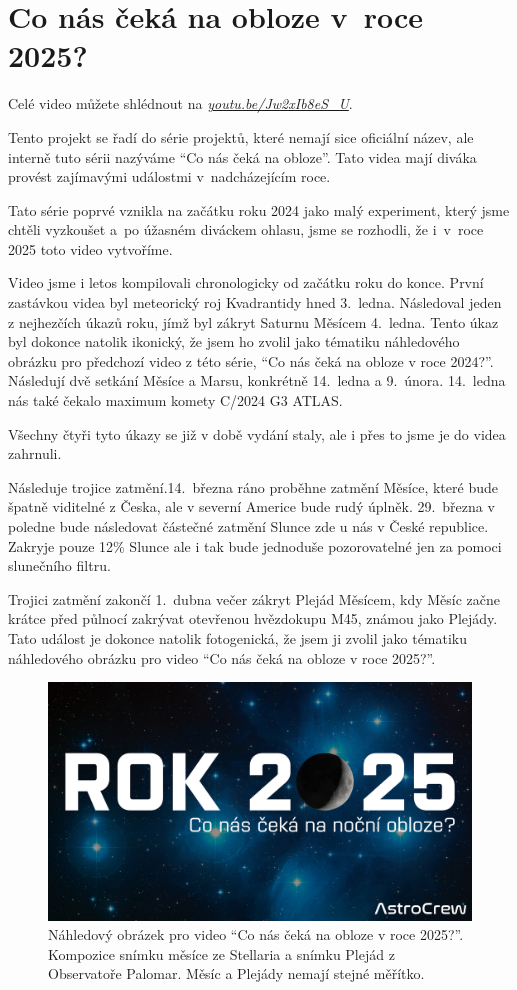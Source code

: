 \documentclass[12pt,a4paper,titlepage]{article}
\newcommand{\link}[2]{\href{#1}{\textcolor{link-color}{\textit{#2}}}}%
\begin{document}
\section{Co nás čeká na obloze v~roce 2025?}
Celé video můžete shlédnout na \link{https://youtu.be/Jw2xIb8eS\_U}{youtu.be/Jw2xIb8eS\_U}.

Tento projekt se řadí do série projektů, které nemají sice oficiální název, ale interně tuto sérii nazýváme \enquote{Co nás čeká na obloze}. Tato videa mají diváka provést zajímavými událostmi v~nadcházejícím roce.

Tato série poprvé vznikla na začátku roku 2024 jako malý experiment, který jsme chtěli vyzkoušet a~po úžasném diváckem ohlasu, jsme se rozhodli, že i~v~roce 2025 toto video vytvoříme.

Video jsme i letos kompilovali chronologicky od začátku roku do konce. První zastávkou videa byl meteorický roj Kvadrantidy hned 3.\ ledna. Následoval jeden z nejhezčích úkazů roku, jímž byl zákryt Saturnu Měsícem 4.\ ledna. Tento úkaz byl dokonce natolik ikonický, že jsem ho zvolil jako tématiku náhledového obrázku pro předchozí video z této série, \enquote{Co nás čeká na obloze v roce 2024?}. Následují dvě setkání Měsíce a Marsu, konkrétně 14.\ ledna a 9.\ února. 14.\ ledna nás také čekalo maximum komety C/2024 G3 ATLAS.\@

Všechny čtyři tyto úkazy se již v době vydání staly, ale i přes to jsme je do videa zahrnuli.

Následuje trojice zatmění.\@ 14.\ března ráno proběhne zatmění Měsíce, které bude špat\-ně viditelné z Česka, ale v severní Americe bude rudý úplněk. 29.\ března v poledne bude následovat částečné zatmění Slunce zde u nás v České republice. Zakryje pouze 12\% Slunce ale i tak bude jednoduše pozorovatelné jen za pomoci slunečního filtru. 

Trojici zatmění zakončí 1.\ dubna večer zákryt Plejád Měsícem, kdy Měsíc začne krátce před půlnocí zakrývat otevřenou hvězdokupu M45, známou jako Plejády. Tato událost je dokonce natolik fotogenická, že jsem ji zvolil jako tématiku náhledového obrázku pro video \enquote{Co nás čeká na obloze v roce 2025?}.

\begin{figure}[H]
	\centering
	\includegraphics[width=.95\textwidth]{nahledovka-v2.jpg}
	\caption{Náhledový obrázek pro video \enquote{Co nás čeká na obloze v roce 2025?}. Kompozice snímku měsíce ze Stellaria a snímku Plejád z Observatoře Palomar. Měsíc a Plejády nemají stejné měřítko.}\label{prac:nahledovka-v2}
\end{figure}
\end{document}
